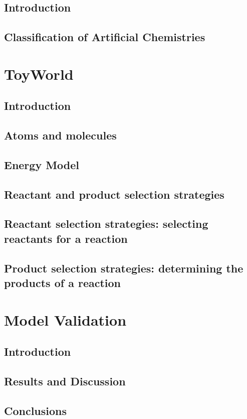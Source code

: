 \documentclass[]{report}
\begin{document}
\section{Introduction}
\section{Classification of Artificial Chemistries}

\chapter{ToyWorld}
\section{Introduction}
\section{Atoms and molecules}
\section{Energy Model}
\section{Reactant and product selection strategies}
\section{Reactant selection strategies: selecting reactants for a reaction}
\section{Product selection strategies: determining the products of a reaction}

\chapter{Model Validation}
\section{Introduction}
\section{Results and Discussion}
\section{Conclusions}
\end{document}
